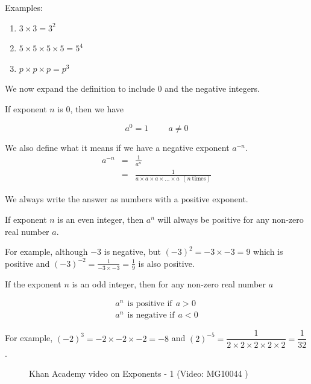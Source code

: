Examples:
\begin{enumerate}[noitemsep, label=\textbf{\arabic*.}]
\item $3 \times 3 = 3^2$
\item $5 \times 5 \times 5 \times 5 = 5^4 $
\item $p \times p \times p = p^3$
\end{enumerate}

We now expand the definition to include 0 and the negative integers.

If exponent $n$ is 0, then we have 

$$ a^0 = 1 \hspace{1cm} a \ne 0 $$


We also define what it means if we have a negative exponent $a^{-n}$.
\begin{eqnarray*}
    a^{-n} &=& \frac{1}{a^n} \\
           &=& \frac{1}{a \times a \times a \times \ldots \times a ~~ (n ~ \textrm{times})} 
\end{eqnarray*}


      
We always write the answer as numbers with a positive exponent.


If exponent $n$ is an even integer, then ${a}^{n}$ will always be positive for any non-zero real number $a$. 

For example, although $-3$ is negative, but $(-3)^2=-3 \times -3 = 9$ which is positive and $(-3)^{-2} = \frac{1}{-3 \times -3} = \frac{1}{9} $ is also positive.

If the exponent $n$ is an odd integer, then for any non-zero real number $a$ 

\begin{eqnarray*}
a^n ~~ \mbox{is positive if} ~~ a > 0 \\
a^n ~~ \mbox{is negative if} ~~ a < 0
\end{eqnarray*}

For example, $(-2)^3 = -2 \times -2 \times -2 = -8$ and $(2)^{-5} = \dfrac{1}{2 \times 2 \times 2 \times 2 \times 2} = \dfrac{1}{32}$.

\setcounter{subfigure}{0}
\begin{figure}[H] %
\textnormal{Khan Academy video on Exponents - 1}\vspace{.1in} 
\label{m38359*yt-media1}\label{m38359*yt-video1}
 { (Video:  MG10044 )}
\end{figure}       


